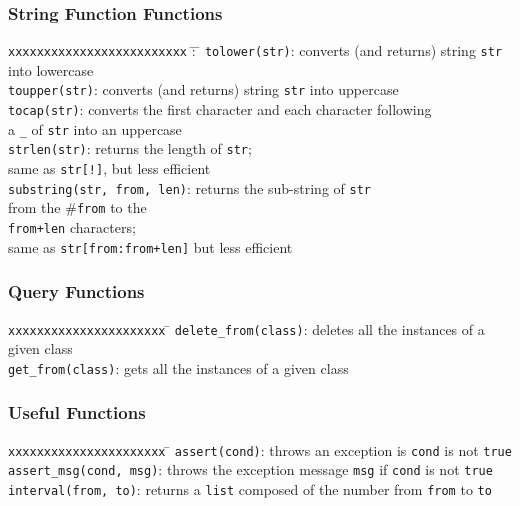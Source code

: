 \subsubsection{String Function Functions}
\begin{tabbing}
\texttt{xxxxxxxxxxxxxxxxxxxxxxxxx} \= : \=\kill
\texttt{tolower(str)}\>: converts (and returns) string \texttt{str} into lowercase\\
\texttt{toupper(str)}\>: converts (and returns) string \texttt{str} into uppercase\\
\texttt{tocap(str)}\>: converts the first character and each character
following\\
\>\>a \texttt{\_} of \texttt{str} into an uppercase\\
\texttt{strlen(str)}\>: returns the length of \texttt{str};\\
\>\> same as \texttt{str[!]}, but less efficient\\
\texttt{substring(str, from, len)}\>: returns the sub-string of \texttt{str}\\
\>\>from the \#\texttt{from} to the\\
\>\> \texttt{from+len} characters;\\
\>\>same as \texttt{str[from:from+len]} but less efficient
\end{tabbing}

\subsubsection{Query Functions}
\begin{tabbing}
\texttt{xxxxxxxxxxxxxxxxxxxxxx} \= \kill
\texttt{delete\_from(class)}\>: deletes all the instances of a given class\\
\texttt{get\_from(class)}\>: gets all the instances of a given class\\
\end{tabbing}

\subsubsection{Useful Functions}
\begin{tabbing}
\texttt{xxxxxxxxxxxxxxxxxxxxxx} \= \kill
\texttt{assert(cond)}\>: throws an exception is \texttt{cond} is not \texttt{true}\\
\texttt{assert\_msg(cond, msg)}\>: throws the exception message \texttt{msg} if \texttt{cond} is not \texttt{true}\\
\texttt{interval(from, to)}\>: returns a \texttt{list} composed of the number
from \texttt{from} to \texttt{to}
\end{tabbing}


